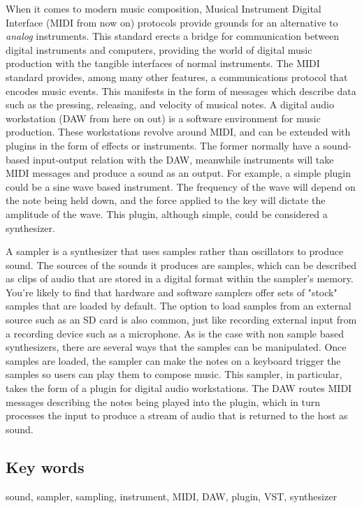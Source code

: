 \documentclass[12pt , a4paper]{article}
\begin{document}
	When it comes to modern music composition, Musical Instrument Digital Interface (MIDI from now on) protocols provide grounds for an alternative to \textit{analog} instruments. This standard erects a bridge for communication between digital instruments and computers, providing the world of digital music production with the tangible interfaces of normal instruments. The MIDI standard provides, among many other features, a communications protocol that encodes music events. This manifests in the form of messages which describe data such as the pressing, releasing, and velocity of musical notes. A digital audio workstation (DAW from here on out) is a software environment for music production. These workstations revolve around MIDI, and can be extended with plugins in the form of effects or instruments. The former normally have a sound-based input-output relation with the DAW, meanwhile instruments will take MIDI messages and produce a sound as an output. For example, a simple plugin could be a sine wave based instrument. The frequency of the wave will depend on the note being held down, and the force applied to the key will dictate the amplitude of the wave. This plugin, although simple, could be considered a synthesizer.
		
	\par
	A sampler is a synthesizer that uses samples rather than oscillators to produce sound.  The sources of the sounds it produces are samples, which can be described as clips of audio that are stored in a digital format within the sampler's memory. You're likely to find that hardware and software samplers offer sets of "stock" samples that are loaded by default. The option to load samples from an external source such as an SD card is also common, just like recording external input from a recording device such as a microphone. As is the case with non sample based synthesizers, there are several ways that the samples can be manipulated. Once samples are loaded, the sampler can make the notes on a keyboard trigger the samples so users can play them to compose music. This sampler, in particular, takes the form of a plugin for digital audio workstations. The DAW routes MIDI messages describing the notes being played into the plugin, which in turn processes the input to produce a stream of audio that is returned to the host as sound.


	\subsection{Key words}
	sound, sampler, sampling, instrument, MIDI, DAW, plugin, VST, synthesizer\\
\end{document}
